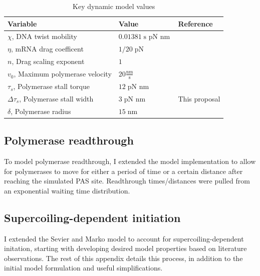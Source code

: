 \documentclass[11pt]{article}
\newcommand{\units}[2]{\frac{\text{#1}}{\text{#2}}\,}
\newcommand{\unit}[1]{\; \text{#1}\,}
\begin{document}
\begin{table}[h]
    \centering
    \begin{tabular}{@{}lll@{}}
        \toprule
        Variable & Value & Reference \\
        \midrule
        \(\chi\), DNA twist mobility  & \(0.01381 \unit{s pN nm}\) & \parencite{sevierPropertiesGeneExpression2018} \\
        \(\eta\), mRNA drag coefficent  & \(1/20 \unit{pN}\) & \parencite{sevierPropertiesGeneExpression2018} \\
        \(n\), Drag scaling exponent  & \(1\) & \parencite{sevierPropertiesGeneExpression2018} \\
        \(v_0\), Maximum polymerase velocity  & \(20 \units{nm}{s}\) & \parencite{sevierPropertiesGeneExpression2018} \\
        \(\tau_s\), Polymerase stall torque  & \(12 \unit{pN nm}\) & \parencite{sevierPropertiesGeneExpression2018} \\
        \(\Delta \tau_s\), Polymerase stall width  & \(3 \unit{pN nm}\) & This proposal \\
        \(\delta\), Polymerase radius  & \(15 \unit{nm}\) & \parencite{sevierPropertiesGeneExpression2018} \\
        \bottomrule
    \end{tabular}
    \caption{Key dynamic model values}
    \label{tab:dynamic_model_constants}
\end{table}

\subsection{Polymerase readthrough}
To model polymerase readthrough, I extended the model implementation to allow for polymerases to move for either a period of time or a certain distance after reaching the simulated PAS site. Readthrough times/distances were pulled from an exponential waiting time distribution.

\subsection{Supercoiling-dependent initiation}
I extended the Sevier and Marko model to account for supercoiling-dependent initation, starting with developing desired model properties based on literature observations. The rest of this appendix details this process, in addition to the initial model formulation and useful simplifications.
\end{document}
